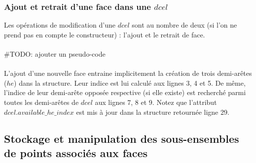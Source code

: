 \documentclass[]{article}
\begin{document}
\begin{multicols}{2}
	
	\subsubsection{Ajout et retrait d'une face dans une $dcel$}
	Les opérations de modification d'une $dcel$ sont au nombre de deux (si l'on ne prend pas en compte le constructeur) : l'ajout et le retrait de face.\\\\
	\#TODO: ajouter un pseudo-code\\\\
	L'ajout d'une nouvelle face entraine implicitement la création de trois demi-arêtes ($he$) dans la structure. Leur indice est lui calculé aux lignes 3, 4 et 5. De même, l'indice de leur demi-arête opposée respective (si elle existe) est recherché parmi toutes les demi-arêtes de $dcel$ aux lignes 7, 8 et 9.
	Notez que l'attribut $dcel.available\_he\_index$ est mis à jour dans la structure retournée ligne 29.
%		
%		

	\subsection{Stockage et manipulation des sous-ensembles de points associés aux faces}
	

	

\end{multicols}
\end{document}
